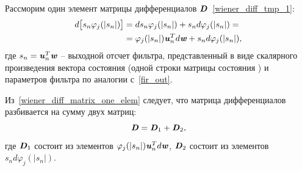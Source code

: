 Рассморим один элемент матрицы дифференциалов $\textbf{\textit{D}}$~\eqref{wiener_diff_tmp_1}:
\begin{align}
	d\big[s_n\varphi_j(|s_n|)\big]&=ds_n\varphi_j(|s_n|)+s_nd\varphi_j(|s_n|)= \nonumber\\
	&=\varphi_j(|s_n|)\textbf{\textit{u}}_n^Td\textbf{\textit{w}}+s_nd\varphi_j(|s_n|),
	\label{wiener_diff_matrix_one_elem}
\end{align}
где $s_n=\textbf{\textit{u}}_n^T\textbf{\textit{w}}$ -- выходной отсчет фильтра, представленный в виде скалярного произведения вектора состояния (одной строки матрицы состояния ) и параметров фильтра по аналогии с~\eqref{fir_out}.

Из~\eqref{wiener_diff_matrix_one_elem} следует, что матрица дифференциалов  разбивается на сумму двух матриц:
\begin{equation}
	\textbf{\textit{D}}=\textbf{\textit{D}}_1+\textbf{\textit{D}}_2,
	\label{wiener_diff_matrix_summ}
\end{equation}
где $\textbf{\textit{D}}_1$ состоит из элементов $\varphi_j(|s_n|)\textbf{\textit{u}}_n^Td\textbf{\textit{w}}$, $\textbf{\textit{D}}_2$ состоит из элементов $s_nd\varphi_j(|s_n|)$.

